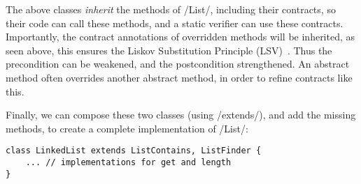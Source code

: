 The above classes \emph{inherit} the methods of /List/, including their contracts, so their code can call these methods, and a static verifier can use these contracts. Importantly, the contract annotations of overridden methods will be inherited, as seen above, this ensures the Liskov Substitution Principle (LSV)~\cite{Liskov:1994:BNS:197320.197383}. Thus the precondition can be weakened, and the postcondition strengthened. An abstract method often overrides another abstract method, in order to refine contracts like this.

Finally, we can compose these two classes (using /extends/), and add the missing methods, to create a complete implementation of /List/:
\begin{lstlisting}
class LinkedList extends ListContains, ListFinder {
	... // implementations for get and length
}
\end{lstlisting}
